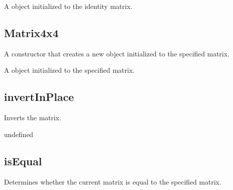 \documentclass[letterpaper,12pt,english,openany,oneside]{sphinxmanual}
\begin{document}
A  object initialized to the identity matrix.


\subsection{Matrix4x4}
\label{\detokenize{JS_3D_API:matrix4x4-2}}\label{\detokenize{JS_3D_API:id12}}
A constructor that creates a new  object initialized to the specified matrix.

\label{\detokenize{JS_3D_API:syntax-37}}

\begin{sphinxVerbatim}[commandchars=\\\{\}]
 
\end{sphinxVerbatim}
\label{\detokenize{JS_3D_API:parameters-24}}

\label{\detokenize{JS_3D_API:section-43}}\label{\detokenize{JS_3D_API:returns-37}}

A  object initialized to the specified matrix.


\subsection{invertInPlace}
\label{\detokenize{JS_3D_API:invertinplace}}
Inverts the matrix.

\label{\detokenize{JS_3D_API:returns-38}}

undefined


\subsection{isEqual}
\label{\detokenize{JS_3D_API:isequal}}
Determines whether the current matrix is equal to the specified matrix.

\label{\detokenize{JS_3D_API:syntax-38}}

\begin{sphinxVerbatim}[commandchars=\\\{\}]
\end{sphinxVerbatim}
\label{\detokenize{JS_3D_API:parameters-25}}
\end{document}
